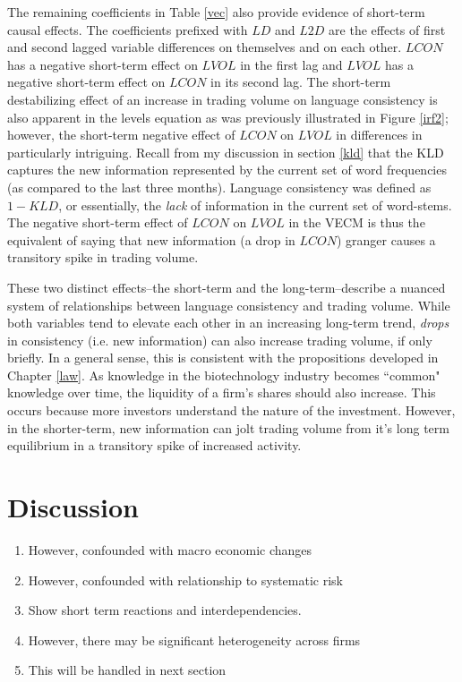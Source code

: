 The remaining coefficients in Table \ref{vec} also provide evidence of short-term causal effects. The coefficients prefixed with $LD$ and $L2D$ are the effects of first and second lagged variable differences on themselves and on each other. $LCON$ has a negative short-term effect on $LVOL$ in the first lag and $LVOL$ has a negative short-term effect on $LCON$ in its second lag. The short-term destabilizing effect of an increase in trading volume on language consistency is also apparent in the levels equation as was previously illustrated in Figure \ref{irf2}; however, the short-term negative effect of $LCON$ on $LVOL$ in differences in particularly intriguing. Recall from my discussion in section \ref{kld} that the KLD captures the new information represented by the current set of word frequencies (as compared to the last three months). Language consistency was defined as $1-KLD$, or essentially, the \emph{lack} of information in the current set of word-stems. The negative short-term effect of $LCON$ on $LVOL$ in the VECM is thus the equivalent of saying that new information (a drop in $LCON$) granger causes a transitory spike in trading volume.

These two distinct effects--the short-term and the long-term--describe a nuanced system of relationships between language consistency and trading volume. While both variables tend to elevate each other in an increasing long-term trend, \emph{drops} in consistency (i.e. new information) can also increase trading volume, if only briefly. In a general sense, this is consistent with the propositions developed in Chapter \ref{law}. As knowledge in the  biotechnology industry becomes ``common" knowledge over time, the liquidity of a firm's shares should also increase. This occurs because more investors understand the nature of the investment. However, in the shorter-term, new information can jolt trading volume from it's long term equilibrium in a transitory spike of increased activity.

\section{Discussion}

\begin{enumerate}
  \item However, confounded with macro economic changes
  \item However, confounded with relationship to systematic risk
  \item Show short term reactions and interdependencies.
  \item However, there may be significant heterogeneity across firms
  \item This will be handled in next section
 \end{enumerate}


